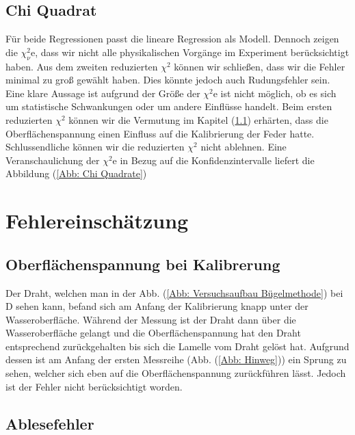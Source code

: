 \documentclass[bibliography=totocnumbered]{scrartcl}
\begin{document}
	
	
	
	\subsection{Chi Quadrat}
	
	
	
	Für beide Regressionen passt die lineare Regression als Modell. Dennoch zeigen die $ \chi^{2}_{\nu} $e, dass wir nicht alle physikalischen Vorgänge im Experiment berücksichtigt haben. Aus dem zweiten reduzierten $ \chi^{2} $ können wir schließen, dass wir die Fehler minimal zu groß gewählt haben. Dies könnte jedoch auch Rudungsfehler sein. Eine klare Aussage ist aufgrund der Größe der $ \chi^{2} $e ist nicht möglich, ob es sich um statistische Schwankungen oder um andere Einflüsse handelt.\smartcite{Grimm.13.07.2021} Beim ersten reduzierten $ \chi^{2} $ können wir die Vermutung im Kapitel (\ref{sect: Fehlerabschätzung Kalibrierung}) erhärten, dass die Oberflächenspannung einen Einfluss auf die Kalibrierung der Feder hatte. Schlussendliche können wir die reduzierten $ \chi^{2} $ nicht ablehnen. Eine Veranschaulichung der $ \chi^{2} $e in Bezug auf die Konfidenzintervalle liefert die Abbildung (\ref{Abb: Chi Quadrate})
	
	
	\newpage
	\section{Fehlereinschätzung}

\subsection{Oberflächenspannung bei Kalibrerung}\label{sect: Fehlerabschätzung Kalibrierung}
Der Draht, welchen man in der Abb. (\ref{Abb: Versuchsaufbau Bügelmethode}) bei D sehen kann, befand sich am Anfang der Kalibrierung knapp unter der Wasseroberfläche. Während der Messung ist der Draht dann über die Wasseroberfläche gelangt und die Oberflächenspannung hat den Draht entsprechend zurückgehalten bis sich die Lamelle vom Draht gelöst hat. Aufgrund dessen ist am Anfang der ersten Messreihe (Abb. (\ref{Abb: Hinweg})) ein Sprung zu sehen, welcher sich eben auf die Oberflächenspannung zurückführen lässt. Jedoch ist der Fehler nicht berücksichtigt worden.
\subsection{Ablesefehler}

\end{document}
